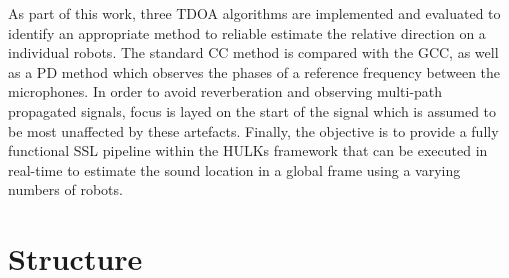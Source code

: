 As part of this work, three \ac{TDOA} algorithms are implemented and evaluated
to identify an appropriate method to reliable estimate the relative direction
on a individual robots. The standard \acf{CC} method is compared with the
\acf{GCC}, as well as a \ac{PD} method which observes the phases of a reference
frequency between the microphones. In order to avoid reverberation and
observing multi-path propagated signals, focus is layed on the start of the
signal which is assumed to be most unaffected by these artefacts. Finally, the
objective is to provide a fully functional \ac{SSL} pipeline within the HULKs
framework that can be executed in real-time to estimate the sound location in
a global frame using a varying numbers of robots.


\section{Structure}
\label{sec:01_Structure}


